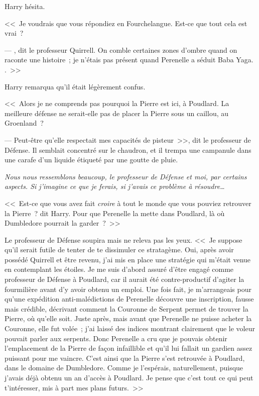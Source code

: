 Harry hésita.

<<~Je voudrais que vous répondiez en Fourchelangue. Est-ce que tout cela est vrai~?

--- , dit le professeur Quirrell. On comble certaines zones d'ombre quand on raconte une histoire~; je n'étais pas présent quand Perenelle a séduit Baba Yaga. .~>>

Harry remarqua qu'il était légèrement confus.

<<~Alors je ne comprends pas pourquoi la Pierre est ici, à Poudlard. La meilleure défense ne serait-elle pas de placer la Pierre sous un caillou, au Groenland~?

--- Peut-être qu'elle respectait mes capacités de pisteur~>>, dit le professeur de Défense. Il semblait concentré sur le chaudron, et il trempa une campanule dans une carafe d'un liquide étiqueté par une goutte de pluie.

\emph{Nous nous ressemblons beaucoup, le professeur de Défense et moi, par certains aspects. Si j'imagine ce que je ferais, si j'avais ce problème à résoudre…}

<<~Est-ce que vous avez fait \emph{croire} à tout le monde que vous pouviez retrouver la Pierre~? dit Harry. Pour que Perenelle la mette dans Poudlard, là où Dumbledore pourrait la garder~?~>>

Le professeur de Défense soupira mais ne releva pas les yeux. <<~Je suppose qu'il serait futile de tenter de te dissimuler ce stratagème. Oui, après avoir possédé Quirrell et être revenu, j'ai mis en place une stratégie qui m'était venue en contemplant les étoiles. Je me suis d'abord assuré d'être engagé comme professeur de Défense à Poudlard, car il aurait été contre-productif d'agiter la fourmilière avant d'y avoir obtenu un emploi. Une fois fait, je m'arrangeais pour qu'une expédition anti-malédictions de Perenelle découvre une inscription, fausse mais crédible, décrivant comment la Couronne de Serpent permet de trouver la Pierre, où qu'elle soit. Juste après, mais avant que Perenelle ne puisse acheter la Couronne, elle fut volée~; j'ai laissé des indices montrant clairement que le voleur pouvait parler aux serpents. Donc Perenelle a cru que je pouvais obtenir l'emplacement de la Pierre de façon infaillible et qu'il lui fallait un gardien assez puissant pour me vaincre. C'est ainsi que la Pierre s'est retrouvée à Poudlard, dans le domaine de Dumbledore. Comme je l'espérais, naturellement, puisque j'avais déjà obtenu un an d'accès à Poudlard. Je pense que c'est tout ce qui peut t'intéresser, mis à part mes plans futurs.~>>

